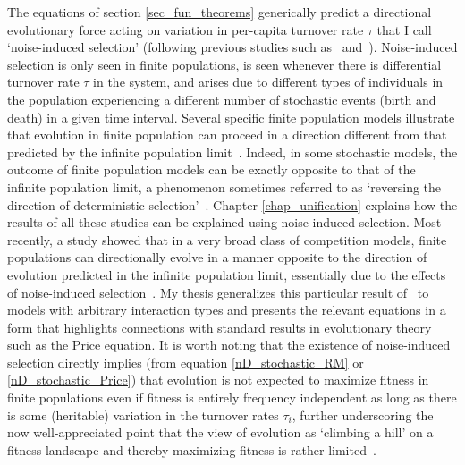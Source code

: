 The equations of section \ref{sec_fun_theorems} generically predict a directional evolutionary force acting on variation in per-capita turnover rate $\tau$ that I call `noise-induced selection' (following previous studies such as~\cite{constable_demographic_2016} and~\cite{week_white_2021}). Noise-induced selection is only seen in finite populations, is seen whenever there is differential turnover rate $\tau$ in the system, and arises due to different types of individuals in the population experiencing a different number of stochastic events (birth and death) in a given time interval. Several specific finite population models illustrate that evolution in finite population can proceed in a direction different from that predicted by the infinite population limit~\citep{parsons_consequences_2010,melbinger_evolutionary_2010, houchmandzadeh_selection_2012, houchmandzadeh_fluctuation_2015,chotibut_evolutionary_2015,debarre_evolutionary_2016, behar_fluctuations-induced_2016, constable_demographic_2016,abu_awad_effects_2018,parsons_pathogen_2018,mcleod_social_2019}. Indeed, in some stochastic models, the outcome of finite population models can be exactly opposite to that of the infinite population limit, a phenomenon sometimes referred to as `reversing the direction of deterministic selection'~\citep{constable_demographic_2016,mcleod_social_2019}. Chapter \ref{chap_unification} explains how the  results of all these studies can be explained using noise-induced selection. Most recently, a study showed that in a very broad class of competition models, finite populations can directionally evolve in a manner opposite to the direction of evolution predicted in the infinite population limit, essentially due to the effects of noise-induced selection~\citep{mazzolini_universality_2022}. My thesis generalizes this particular result of~\cite{mazzolini_universality_2022} to models with arbitrary interaction types and presents the relevant equations in a form that highlights connections with standard results in evolutionary theory such as the Price equation. It is worth noting that the existence of noise-induced selection directly implies (from equation \eqref{nD_stochastic_RM} or \eqref{nD_stochastic_Price}) that evolution is not expected to maximize fitness in finite populations even if fitness is entirely frequency independent as long as there is some (heritable) variation in the turnover rates $\tau_i$, further underscoring the now well-appreciated point that the view of evolution as `climbing a hill' on a fitness landscape and thereby maximizing fitness is rather limited~\citep{grodwohl_theory_2017}.

